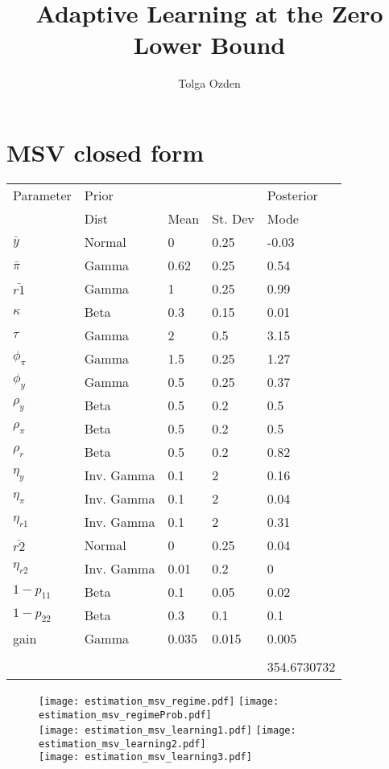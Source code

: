 \documentclass[12pt,reqno]{article}
\title{Adaptive Learning at the Zero Lower Bound}
\author{Tolga Ozden}
\numberwithin{equation}{section}
\begin{document}

\section*{ MSV closed form } 


\begin{table}[H]
\begin{tabular}{l|lll|l}
Parameter & Prior &  &  & Posterior \\
 & Dist & Mean & St. Dev & Mode \\
$\bar{y}$ & Normal & 0 & 0.25 & -0.03 \\
$\bar{\pi}$ & Gamma & 0.62 & 0.25 & 0.54 \\
$\bar{r1}$ & Gamma & 1 & 0.25 & 0.99 \\
$\kappa$ & Beta & 0.3 & 0.15 & 0.01 \\
$\tau$ & Gamma & 2 & 0.5 & 3.15 \\
$\phi_{\pi}$ & Gamma & 1.5 & 0.25 & 1.27 \\
$\phi_y$ & Gamma & 0.5 & 0.25 & 0.37 \\
$\rho_y$ & Beta & 0.5 & 0.2 & 0.5 \\
$\rho_{\pi}$ & Beta & 0.5 & 0.2 & 0.5 \\
$\rho_r$ & Beta & 0.5 & 0.2 & 0.82 \\
$\eta_y$ & Inv. Gamma & 0.1 & 2 & 0.16 \\
$\eta_{\pi}$ & Inv. Gamma & 0.1 & 2 & 0.04 \\
$\eta_{r1}$ & Inv. Gamma & 0.1 & 2 & 0.31 \\
$\bar{r2}$ & Normal & 0 & 0.25 & 0.04 \\
$\eta_{r2}$ & Inv. Gamma & 0.01 & 0.2 & 0 \\
$1-p_{11}$ & Beta & 0.1 & 0.05 & 0.02 \\
$1-p_{22}$ & Beta & 0.3 & 0.1 & 0.1 \\
gain & Gamma & 0.035 & 0.015 & 0.005 \\
 &  &  &  &  \\
 &  &  &  & 354.6730732
\end{tabular}
\end{table}


\begin{figure}[H]
\texttt{[image: estimation\_msv\_regime.pdf]}
\texttt{[image: estimation\_msv\_regimeProb.pdf]}\\
\texttt{[image: estimation\_msv\_learning1.pdf]}
\texttt{[image: estimation\_msv\_learning2.pdf]} \\
\texttt{[image: estimation\_msv\_learning3.pdf]}\\

\end{figure}
\end{document}
